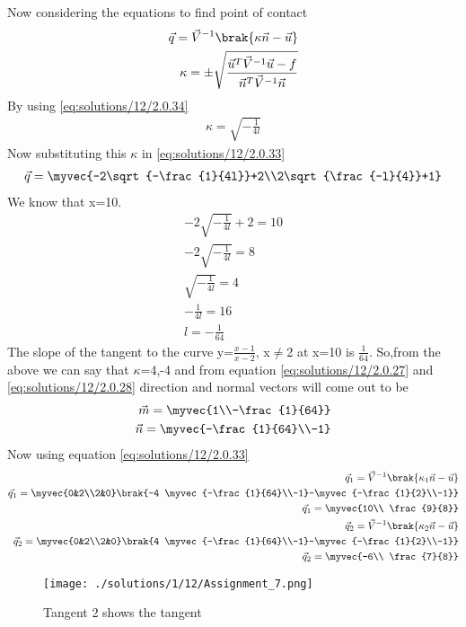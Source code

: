 Now considering the equations to find point of contact
\begin{align} \vec{q} = \vec{V}^{-1}\brak{\kappa \vec{n}-\vec{u}}\label{eq:solutions/12/2.0.33}
\\
\kappa = \pm \sqrt{\frac{\vec{u}^T\vec{V}^{-1}\vec{u}-f}{\vec{n}^T\vec{V}^{-1}\vec{n}}} \label{eq:solutions/12/2.0.34}
\end{align}
By using \eqref{eq:solutions/12/2.0.34}
\begin{align}
\kappa=\sqrt{-\frac{1}{4l}}
\end{align}
Now substituting this $\kappa$ in \eqref{eq:solutions/12/2.0.33}
\begin{align}
\vec{q}=\myvec{-2\sqrt{-\frac{1}{4l}}+2\\2\sqrt{\frac{-l}{4}}+1}
\end{align}
We know that x=10.
\begin{align}
-2\sqrt{-\frac{1}{4l}}+2=10\\
-2\sqrt{-\frac{1}{4l}}=8\\
\sqrt{-\frac{1}{4l}}=4\\
-\frac{1}{4l}=16\\
l=-\frac{1}{64}
\end{align}
The slope of the tangent to the curve y=$\frac{x-1}{x-2}$, x$\not=$2 at x=10 is $\frac{1}{64}$.
So,from the above we can say that $\kappa$=4,-4 and from equation \eqref{eq:solutions/12/2.0.27} and \eqref{eq:solutions/12/2.0.28} direction and normal vectors will come out to be
\begin{align}
\vec{m}=\myvec{1\\-\frac{1}{64}}\\
\vec{n}=\myvec{-\frac{1}{64}\\-1}
\end{align}
Now using equation \eqref{eq:solutions/12/2.0.33}
\begin{align}
\vec{q}_1 = \vec{V}^{-1}\brak{\kappa_1 \vec{n}-\vec{u}}\\
\vec{q}_1 = \myvec{0&2\\2&0}\brak{-4 \myvec{-\frac{1}{64}\\-1}-\myvec{-\frac{1}{2}\\-1}}\\
\vec{q}_1=\myvec{10\\ \frac{9}{8}}\\
\vec{q}_2 = \vec{V}^{-1}\brak{\kappa_2 \vec{n}-\vec{u}}\\
\vec{q}_2 = \myvec{0&2\\2&0}\brak{4 \myvec{-\frac{1}{64}\\-1}-\myvec{-\frac{1}{2}\\-1}}\\
\vec{q}_2=\myvec{-6\\ \frac{7}{8}}
\end{align}
  \begin{figure}[h!]
	\centering
	\texttt{[image: ./solutions/1/12/Assignment\_7.png]}
	\caption{Tangent 2 shows the tangent}
	\label{eq:solutions/12/myfig}
\end{figure}

